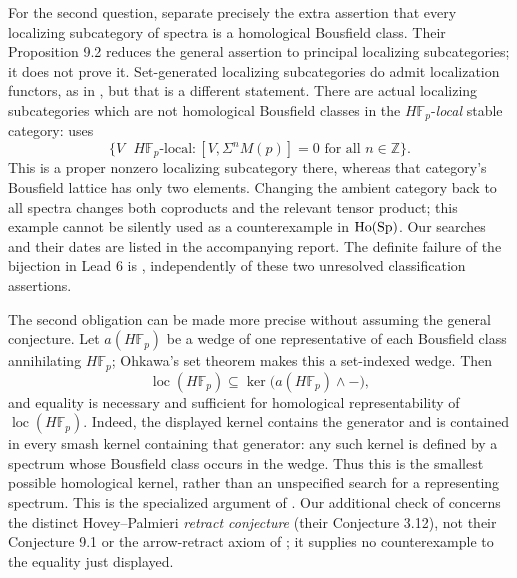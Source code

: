 For the second question, \citet[Conjecture 9.1 and Proposition 9.2]{FHoveyPalmieri1999}
separate precisely the extra assertion that every localizing subcategory
of spectra is a homological Bousfield class. Their Proposition 9.2
reduces the general assertion to principal localizing subcategories;
it does not prove it. Set-generated localizing subcategories do admit
localization functors, as in
\citet[Theorem 3.7 and Proposition 3.8]{FCasacubertaGutierrezRosicky2014},
but that is a different statement. There are actual localizing
subcategories which are not homological Bousfield classes in the
$H\mathbb F_p$-\emph{local} stable category:
\citet[Proposition 6.4]{FWolcott2015} uses
\[
 \{V\text{ $H\mathbb F_p$-local}:
       [V,\Sigma^nM(p)]=0\text{ for all }n\in\mathbb Z\}.
\]
This is a proper nonzero localizing subcategory there, whereas that
category's Bousfield lattice has only two elements. Changing the
ambient category back to all spectra changes both coproducts and the
relevant tensor product; this example cannot be silently used as a
counterexample in $\operatorname{Ho}(\mathrm{Sp})$. Our searches and their dates are listed
in the accompanying report. The definite failure of the bijection in
Lead 6 is , independently of these two unresolved
classification assertions.

The second obligation can be made more precise without assuming the
general conjecture. Let $a(H\mathbb F_p)$ be a wedge of one representative
of each Bousfield class annihilating $H\mathbb F_p$; Ohkawa's set theorem
makes this a set-indexed wedge. Then
\[
 \operatorname{loc}(H\mathbb F_p)\subseteq
 \ker\bigl(a(H\mathbb F_p)\wedge-\bigr),
\]
and equality is necessary and sufficient for homological representability
of $\operatorname{loc}(H\mathbb F_p)$.
Indeed, the displayed kernel contains the generator and is contained
in every smash kernel containing that generator: any such kernel
is defined by a spectrum whose Bousfield class occurs in the wedge.
Thus this is the smallest possible homological kernel, rather than an
unspecified search for a representing spectrum. This is the specialized
argument of \citet[Proposition 9.2]{FHoveyPalmieri1999}.
Our additional check of \citet[Corollary 1.2]{FPuetzstueck2026}
concerns the distinct Hovey--Palmieri \emph{retract conjecture}
(their Conjecture 3.12), not their Conjecture 9.1 or the arrow-retract
axiom of ; it supplies no counterexample to the equality
just displayed.

